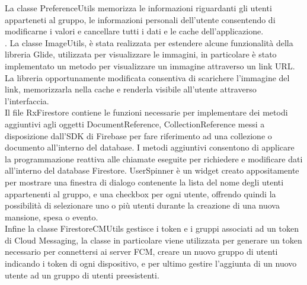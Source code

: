 La classe PreferenceUtils memorizza le informazioni riguardanti gli utenti apparteneti al gruppo, le informazioni personali dell'utente consentendo di modificarne i valori e cancellare tutti i dati e le cache dell'applicazione.\\.
La classe ImageUtils, è stata realizzata per estendere alcune funzionalità della libreria Glide, utilizzata per visualizzare le immagini, in particolare è stato implementato un metodo per visualizzare un immagine attraverso un link URL. La libreria opportunamente modificata consentiva di scarichere l'immagine del link, memorizzarla nella cache e renderla visibile all'utente attraverso l'interfaccia.\\
Il file RxFirestore contiene le funzioni necessarie per implementare dei metodi aggiuntivi agli oggetti DocumentReference, CollectionReference messi a disposizione dall'SDK di Firebase per fare riferimento ad una collezione o documento all'interno del database. I metodi aggiuntivi consentono di applicare la programmazione reattiva alle chiamate eseguite per richiedere e modificare dati all'interno del database Firestore.
UserSpinner è un widget creato appositamente per mostrare una finestra di dialogo contenente la lista del nome degli utenti appartenenti al gruppo, e una checkbox per ogni utente, offrendo quindi la possibilità di selezionare uno o più utenti durante la creazione di una nuova mansione, spesa o evento.\\
Infine la classe FirestoreCMUtils gestisce i token e i gruppi associati ad un token di Cloud Messaging, la classe in particolare viene utilizzata per generare un token necessario per connettersi ai server FCM, creare un nuovo gruppo di utenti indicando i token di ogni dispositivo, e per ultimo gestire l'aggiunta di un nuovo utente ad un gruppo di utenti preesistenti.

